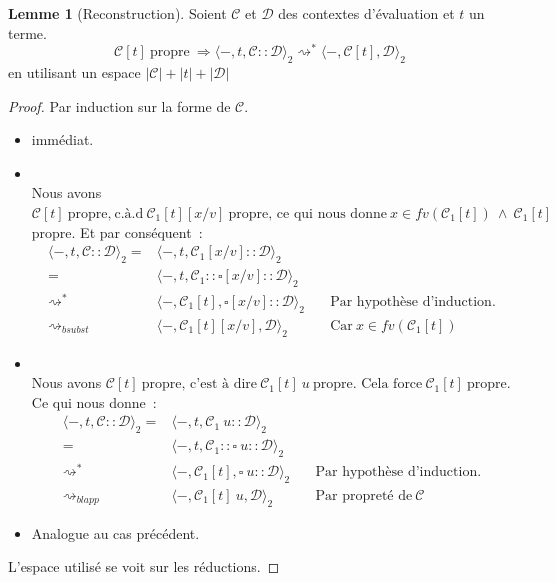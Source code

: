 \documentclass[11pt,a4paper]{article}
\theoremstyle{definition}
\newtheorem{lemma}[theorem]{Lemme}
\newcommand{\mtd}{\mathcal{D}}
\newcommand{\mtc}{\mathcal{C}}
\begin{document}
\begin{lemma}[Reconstruction]
  \label{lemmaportugal}
  Soient $\mathcal{C}$ et $\mathcal{D}$ des contextes d'évaluation et $t$ un terme.
  \[\mathcal{C}[t]~\text{propre}~\Rightarrow \langle-,t,\mathcal{C}::\mathcal{D}\rangle_2 \rightsquigarrow^* \langle-,\mathcal{C}[t],\mathcal{D}\rangle_2\]
en utilisant un espace $|\mtc|+|t|+|\mtd|$
\end{lemma}
\begin{proof}
  Par induction sur la forme de $\mathcal{C}$.
  \begin{itemize}
    \item {} immédiat.
    \item {}\\
      Nous avons
       $ \mathcal{C}[t]~\text{propre,}~\text{c.à.d}~\mathcal{C}_1[t][x/v]~\text{propre, ce qui nous donne}~x\in fv(\mathcal{C}_1[t])~\wedge~\mathcal{C}_1[t]~$propre.
      Et par conséquent~:
      \begin{align*}
        \langle -, t, \mathcal{C} :: \mathcal{D}\rangle_2 = &\langle -, t, \mathcal{C}_1[x/v]:: \mathcal{D}\rangle_2 \\
        = &\langle -, t, \mathcal{C}_1:: \square[x/v] :: \mathcal{D}\rangle_2 \\
        \rightsquigarrow^* &\langle -, \mathcal{C}_1[t], \square[x/v]:: \mathcal{D}\rangle_2 \quad &\text{Par hypothèse d'induction.}\\
        \rightsquigarrow_{bsubst} &\langle -, \mathcal{C}_1[t][x/v], \mathcal{D}\rangle_2 \quad &\text{Car}~x\in fv(\mathcal{C}_1[t])
      \end{align*}
    \item {}\\
      Nous avons $\mathcal{C}[t]~\text{propre, c'est à dire}~\mathcal{C}_1[t]~u~\text{propre. Cela force}~\mathcal{C}_1[t]~$propre.
      Ce qui nous donne~:
      \begin{align*}
        \langle -, t, \mathcal{C} :: \mathcal{D}\rangle_2 = &\langle -, t, \mathcal{C}_1~u:: \mathcal{D}\rangle_2 \\
        = &\langle -, t, \mathcal{C}_1:: \square~u :: \mathcal{D}\rangle_2 \\
        \rightsquigarrow^* &\langle -, \mathcal{C}_1[t], \square~u:: \mathcal{D}\rangle_2 \quad &\text{Par hypothèse d'induction.}\\
        \rightsquigarrow_{blapp} &\langle -, \mathcal{C}_1[t]~u, \mathcal{D}\rangle_2 \quad &\text{Par propreté de}~\mathcal{C}
      \end{align*}
    \item {} Analogue au cas précédent.
  \end{itemize}
  L'espace utilisé se voit sur les réductions.
\end{proof}
\end{document}
